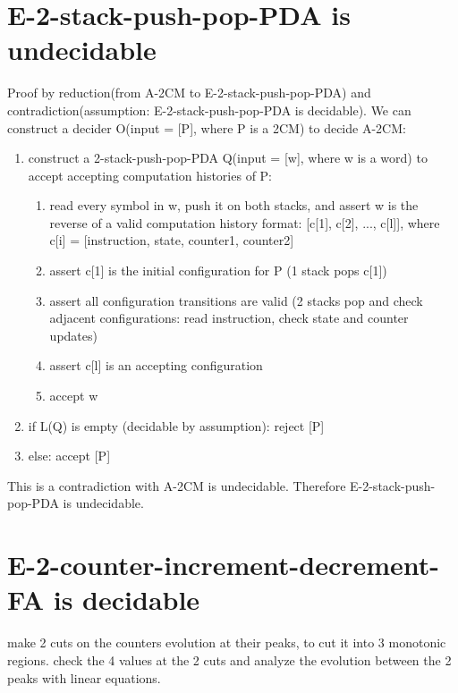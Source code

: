 \documentclass{article}
\begin{document}
\section{E-2-stack-push-pop-PDA is undecidable}
Proof by reduction(from A-2CM to E-2-stack-push-pop-PDA) and 
contradiction(assumption: E-2-stack-push-pop-PDA is decidable).
We can construct a decider O(input = [P], where P is a 2CM) to decide A-2CM:
\begin{enumerate}
	\item construct a 2-stack-push-pop-PDA Q(input = [w], where w is a word) to 
	accept accepting computation histories of P:
	\begin{enumerate}
		\item read every symbol in w, push it on both stacks, and assert w is the reverse of a valid computation history format: [c[1], c[2], ..., c[l]], where c[i] = [instruction, state, counter1, counter2]
		\item assert c[1] is the initial configuration for P (1 stack pops c[1])
		\item assert all configuration transitions are valid (2 stacks pop and check adjacent configurations: read instruction, check state and counter updates)
		\item assert c[l] is an accepting configuration
		\item accept w
	\end{enumerate}
	\item if L(Q) is empty (decidable by assumption): reject [P]
	\item else: accept [P]
\end{enumerate}
This is a contradiction with A-2CM is undecidable. Therefore E-2-stack-push-pop-PDA is undecidable.

\section{E-2-counter-increment-decrement-FA is decidable}
make 2 cuts on the counters evolution at their peaks, to cut it into 3 monotonic regions. check the 4 values at the 2 cuts and analyze the evolution between the 2 peaks with linear equations.
\end{document}
